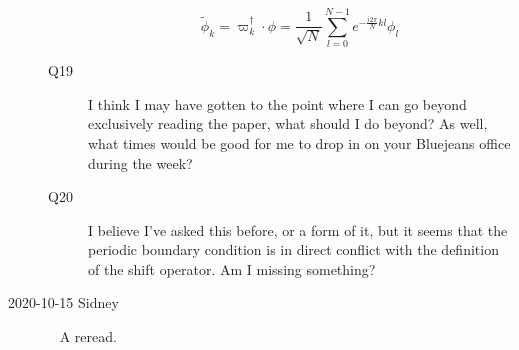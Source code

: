 \begin{description}
\begin{description}
$$\tilde{\phi}_k=\varpi^{\dagger}_k\cdot\phi=\frac{1}{\sqrt{N}}\sum^{N-1}_{l=0}e^{-\frac{i2\pi}{N}kl}\phi_l$$

\item[Q19]
I think I may have gotten to the point where I can go beyond exclusively reading the paper, what should I do beyond? As well, what times would be good for me to drop in on your Bluejeans office during the week?

\item[Q20]
I believe I've asked this before, or a form of it, but it seems that the periodic boundary condition is in direct conflict with the definition of the shift operator. Am I missing something?
\end{description}

\item[2020-10-15 Sidney]~ A reread.


\end{description}
